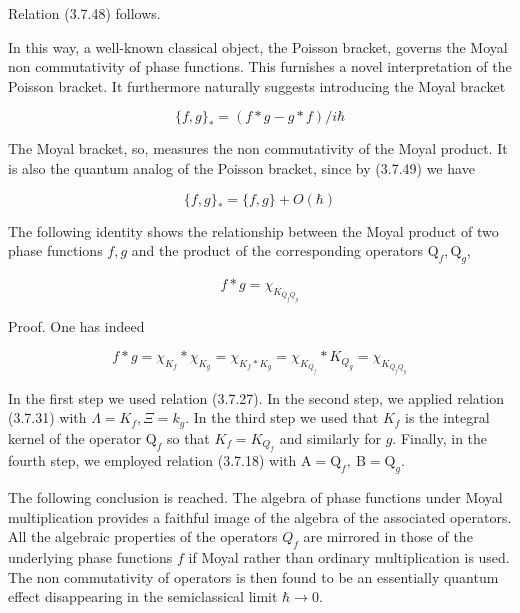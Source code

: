 \documentclass{article}
\begin{document}
Relation (3.7.48) follows.

In this way, a well-known classical object, the Poisson bracket, governs the Moyal non commutativity of phase functions. This furnishes a novel interpretation of the Poisson bracket. It furthermore naturally suggests introducing the Moyal bracket
 
\begin{equation*}
\{f, g\}_{*}=(f * g-g * f) / i \hbar \tag{3.7.51}
\end{equation*}
 

The Moyal bracket, so, measures the non commutativity of the Moyal product. It is also the quantum analog of the Poisson bracket, since by (3.7.49) we have
 
\begin{equation*}
\{f, g\}_{*}=\{f, g\}+O(\hbar) \tag{3.7.52}
\end{equation*}
 

The following identity shows the relationship between the Moyal product of two phase functions $f, g$ and the product of the corresponding operators $\mathrm{Q}_{f}, \mathrm{Q}_{g}$,
 
\begin{equation*}
f * g=\chi_{K_{Q_{f} Q_{g}}} \tag{3.7.53}
\end{equation*}
 

Proof. One has indeed
 
\begin{equation*}
f * g=\chi_{K_{f}} * \chi_{K_{g}}=\chi_{K_{f} * K_{g}}=\chi_{K_{Q_{f}}} * K_{Q_{g}}=\chi_{K_{Q_{f} Q_{g}}} \tag{3.7.54}
\end{equation*}
 

In the first step we used relation (3.7.27). In the second step, we applied relation (3.7.31) with $\Lambda=K_{f}, \Xi=k_{g}$. In the third step we used that $K_{f}$ is the integral kernel of the operator $\mathrm{Q}_{f}$ so that $K_{f}=K_{Q_{f}}$ and similarly for $g$. Finally, in the fourth step, we employed relation (3.7.18) with $\mathrm{A}=\mathrm{Q}_{f}, \mathrm{~B}=\mathrm{Q}_{g}$.

The following conclusion is reached.
The algebra of phase functions under Moyal multiplication provides a faithful image of the algebra of the associated operators. All the algebraic properties of the operators $Q_{f}$ are mirrored in those of the underlying phase functions $f$ if Moyal rather than ordinary multiplication is used. The non commutativity of operators is then found to be an essentially quantum effect disappearing in the semiclassical limit $\hbar \rightarrow 0$.
\end{document}
